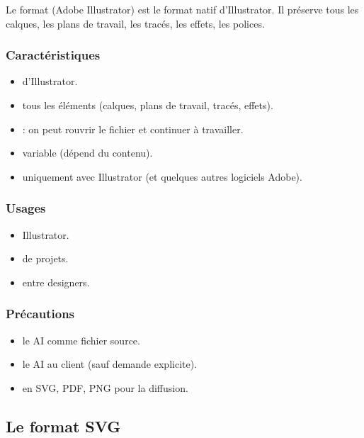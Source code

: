 Le format  (Adobe Illustrator) est le format natif d'Illustrator. Il préserve tous les calques, les plans de travail, les tracés, les effets, les polices.

\subsubsection{Caractéristiques}

\begin{itemize}
    \item {} d'Illustrator.
    \item {} tous les éléments (calques, plans de travail, tracés, effets).
    \item {} : on peut rouvrir le fichier et continuer à travailler.
    \item {} variable (dépend du contenu).
    \item {} uniquement avec Illustrator (et quelques autres logiciels Adobe).
\end{itemize}

\subsubsection{Usages}

\begin{itemize}
    \item {} Illustrator.
    \item {} de projets.
    \item {} entre designers.
\end{itemize}

\subsubsection{Précautions}

\begin{itemize}
    \item {} le AI comme fichier source.
    \item {} le AI au client (sauf demande explicite).
    \item {} en SVG, PDF, PNG pour la diffusion.
\end{itemize}

\subsection{Le format SVG}

